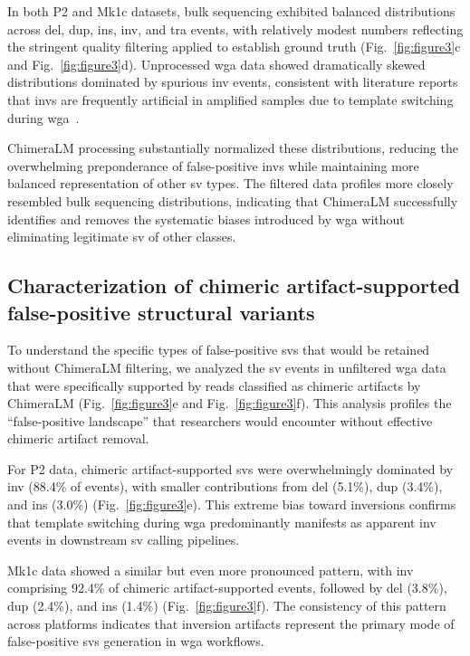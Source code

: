 \documentclass[pdflatex,sn-nature]{sn-jnl}%
\theoremstyle{thmstyleone}%
\theoremstyle{thmstyletwo}%
\theoremstyle{thmstylethree}%
\begin{document}
In both P2 and Mk1c datasets, bulk sequencing exhibited balanced distributions across \gls{del}, \gls{dup}, \gls{ins}, \gls{inv}, and \gls{tra} events, with relatively modest numbers reflecting the stringent quality filtering applied to establish ground truth (Fig.~\ref{fig:figure3}c and Fig.~\ref{fig:figure3}d).
Unprocessed \gls{wga} data showed dramatically skewed distributions dominated by spurious \gls{inv} events, consistent with literature reports that \glspl{inv} are frequently artificial in amplified samples due to template switching during \gls{wga}~\cite{lu2023exploration, lu2023chimera}.

ChimeraLM processing substantially normalized these distributions, reducing the overwhelming preponderance of false-positive \glspl{inv} while maintaining more balanced representation of other \gls{sv} types.
The filtered data profiles more closely resembled bulk sequencing distributions, indicating that ChimeraLM successfully identifies and removes the systematic biases introduced by \gls{wga} without eliminating legitimate \gls{sv} of other classes.

\subsection*{Characterization of chimeric artifact-supported false-positive structural variants}

To understand the specific types of false-positive \glspl{sv} that would be retained without ChimeraLM filtering, we analyzed the \gls{sv} events in unfiltered \gls{wga} data that were specifically supported by reads classified as chimeric artifacts by ChimeraLM (Fig.~\ref{fig:figure3}e and Fig.~\ref{fig:figure3}f).
This analysis profiles the ``false-positive landscape'' that researchers would encounter without effective chimeric artifact removal.

For P2 data, chimeric artifact-supported \glspl{sv} were overwhelmingly dominated by \gls{inv} (88.4\% of events), with smaller contributions from \gls{del} (5.1\%), \gls{dup} (3.4\%), and \gls{ins} (3.0\%) (Fig.~\ref{fig:figure3}e).
This extreme bias toward inversions confirms that template switching during \gls{wga} predominantly manifests as apparent \gls{inv} events in downstream \gls{sv} calling pipelines.

Mk1c data showed a similar but even more pronounced pattern, with \gls{inv} comprising 92.4\% of chimeric artifact-supported events, followed by \gls{del} (3.8\%), \gls{dup} (2.4\%), and \gls{ins} (1.4\%) (Fig.~\ref{fig:figure3}f).
The consistency of this pattern across platforms indicates that inversion artifacts represent the primary mode of false-positive \glspl{sv} generation in \gls{wga} workflows.
\end{document}
